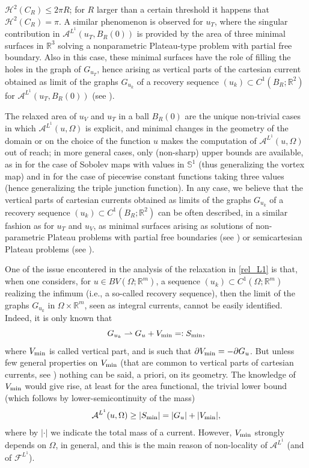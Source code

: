 \documentclass[a4paper,11pt]{article}
\numberwithin{equation}{section}
\newcommand{\Om}{\Omega}
\newcommand{\R}{\mathbb{R}}
\begin{document}
$\mathcal H^2(C_R)\leq 2\pi R$; for $R$ larger than a certain threshold it happens that $\mathcal H^2(C_R)=\pi$.
A similar phenomenon is observed for $u_T$, where the singular contribution in $\mathcal A^{L^1}(u_T,B_R(0))$ is provided by the area of three minimal surfaces in $\R^3$ solving a nonparametric Plateau-type problem with partial free boundary. Also in this case, these minimal surfaces have the role of filling the holes in the graph of $G_{u_T}$, hence arising as vertical parts of the cartesian current obtained as limit of the graphs $G_{u_k}$ of a recovery sequence $(u_k)\subset C^1(B_R;\R^2)$ for $  \mathcal A^{L^1}(u_T,B_R(0))$ (see \cite{BePa:10,Scala:19}).

The relaxed area of $u_V$ and $u_T$ in a ball $B_R(0)$ are the unique non-trivial cases in which $\mathcal A^{L^1}(u,\Om)$ is explicit, and minimal changes in the geometry of the domain or on the choice of the function $u$ makes the computation of $\mathcal A^{L^1}(u,\Om)$ out of reach; in more general cases, only (non-sharp) upper bounds are available, as in \cite{BSS} for the case of Sobolev maps with values in $\mathbb S^1$ (thus generalizing the vortex map) and in \cite{BeElPaSc:19,ScSc} for the case of piecewise constant functions taking three values (hence generalizing the triple junction function). In any case, we believe that the vertical parts of cartesian currents obtained as limits of the graphs $G_{u_k}$ of a recovery sequence $(u_k)\subset C^1(B_R;\R^2)$ can be often described, in a similar fashion as for $u_T$ and $u_V$, as minimal surfaces  arising as solutions of non-parametric Plateau problems with partial free boundaries (see \cite{BMS}) or semicartesian Plateau problems (see \cite{BePaTe:15,BePaTe:16}). 

One of the issue encontered in the analysis of the relaxation in \eqref{rel_L1} is that, when one considers, for $u\in BV(\Om;\R^m)$, a sequence $(u_k)\subset C^1(\Om;\R^m)$ realizing the infimum (i.e., a so-called recovery sequence), then the limit of the graphs $G_{u_k}$ in $\Om\times \R^m$, seen as integral currents, cannot be easily identified. Indeed, it is only known that 
$$G_{u_k}\rightharpoonup G_u+V_{{\rm min}}=:S_{{\rm min}},$$
where $V_{{\rm min}}$ is called vertical part, and is such that $\partial V_{{\rm min}}=-\partial G_u$. But unless few general properties on $V_{{\rm min}}$ (that are common to vertical parts of cartesian currents, see \cite{GMS2}) nothing can be said, a priori,  on its geometry. The knowledge of $V_{{\rm min}}$ would give rise, at least for the area functional, the trivial lower bound (which follows by lower-semicontinuity of the mass)
$$\mathcal A^{L^1}(u,\Om)\geq |S_{{\rm min}}|=|G_u|+|V_{{\rm min}}|,$$
where by $|\cdot|$ we indicate the total mass of a current.
However, $V_{{\rm min}}$ strongly depends on $\Om$, in general, and this is the main reason of non-locality of $\mathcal A^{L^1}$ (and of $\mathcal F^{L^1}$). 
\end{document}

